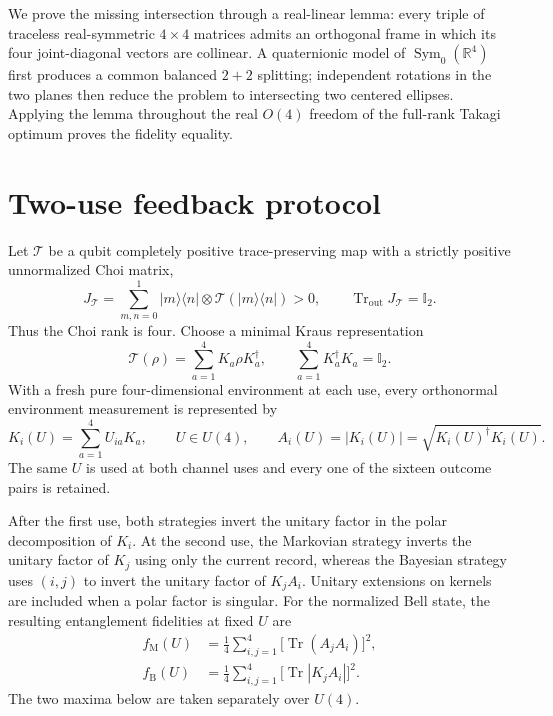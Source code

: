 \documentclass[11pt]{article}
\theoremstyle{remark}
\newcommand{\Tr}{\operatorname{Tr}}
\newcommand{\1}{\mathbb{I}}
\newcommand{\R}{\mathbb{R}}
\newcommand{\M}{\mathrm{M}}
\newcommand{\B}{\mathrm{B}}
\begin{document}
We prove the missing intersection through a real-linear lemma: every triple
of traceless real-symmetric $4\times4$ matrices admits an orthogonal frame in
which its four joint-diagonal vectors are collinear.  A quaternionic model of
$\operatorname{Sym}_0(\R^4)$ first produces a common balanced $2+2$
splitting; independent rotations in the two planes then reduce the problem
to intersecting two centered ellipses.  Applying the lemma throughout the
real $O(4)$ freedom of the full-rank Takagi optimum proves the fidelity
equality.

\section{Two-use feedback protocol}
\label{sec:model}

Let $\mathcal T$ be a qubit completely positive trace-preserving map with a
strictly positive unnormalized Choi matrix,
\begin{equation}
 J_{\mathcal T}=\sum_{m,n=0}^{1}|m\rangle\langle n|\otimes
 \mathcal T(|m\rangle\langle n|)>0,
 \qquad \Tr_{\mathrm{out}}J_{\mathcal T}=\1_2 .
 \label{eq:choi}
\end{equation}
Thus the Choi rank is four.  Choose a minimal Kraus representation
\begin{equation}
 \mathcal T(\rho)=\sum_{a=1}^{4}K_a\rho K_a^\dagger,
 \qquad \sum_{a=1}^{4}K_a^\dagger K_a=\1_2 .
 \label{eq:kraus}
\end{equation}
With a fresh pure four-dimensional environment at each use, every orthonormal
environment measurement is represented by
\begin{equation}
 K_i(U)=\sum_{a=1}^{4}U_{ia}K_a,\qquad U\in U(4),\qquad
 A_i(U)=|K_i(U)|=\sqrt{K_i(U)^\dagger K_i(U)}.
 \label{eq:mix}
\end{equation}
The same $U$ is used at both channel uses and every one of the sixteen outcome
pairs is retained.

After the first use, both strategies invert the unitary factor in the polar
decomposition of $K_i$.  At the second use, the Markovian strategy inverts
the unitary factor of $K_j$ using only the current record, whereas the
Bayesian strategy uses $(i,j)$ to invert the unitary factor of $K_jA_i$.
Unitary extensions on kernels are included when a polar factor is singular.
For the normalized Bell state, the resulting entanglement fidelities at fixed
$U$ are \cite{RexitiEtAl2024}
\begin{align}
 f_{\M}(U)&=\frac14\sum_{i,j=1}^{4}
       \bigl[\Tr(A_jA_i)\bigr]^2, \\
 f_{\B}(U)&=\frac14\sum_{i,j=1}^{4}
       \bigl[\Tr|K_jA_i|\bigr]^2 .
 \label{eq:fidelities}
\end{align}
The two maxima below are taken separately over $U(4)$.
\end{document}
